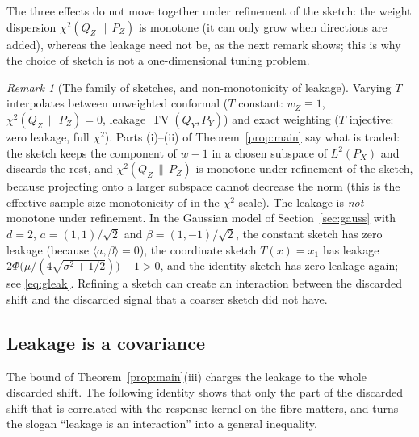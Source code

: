 \documentclass[11pt,a4paper]{article}
\newcommand{\PX}{P_X}
\newcommand{\chisqZ}{\chi^2(Q_Z\,\|\,P_Z)}
\newcommand{\TV}{\operatorname{TV}}
\theoremstyle{plain}
\theoremstyle{definition}
\theoremstyle{remark}
\newtheorem{remark}[theorem]{Remark}
\begin{document}
The three effects do not move together under refinement of the sketch: the weight dispersion $\chisqZ$ is monotone (it can only grow when directions are added), whereas the leakage need not be, as the next remark shows; this is why the choice of sketch is not a one-dimensional tuning problem.
\begin{remark}[The family of sketches, and non-monotonicity of leakage]\label{rem:family}
Varying $T$ interpolates between unweighted conformal ($T$ constant: $w_Z\equiv1$, $\chisqZ=0$, leakage $\TV(Q_Y,P_Y)$) and exact weighting ($T$ injective: zero leakage, full $\chi^2$). Parts (i)--(ii) of Theorem~\ref{prop:main} say what is traded: the sketch keeps the component of $w-1$ in a chosen subspace of $L^2(\PX)$ and discards the rest, and $\chisqZ$ is monotone under refinement of the sketch, because projecting onto a larger subspace cannot decrease the norm (this is the effective-sample-size monotonicity of \cite[Thm.\ 5.2]{polo2022} in the $\chi^2$ scale). The leakage is \emph{not} monotone under refinement. In the Gaussian model of Section~\ref{sec:gauss} with $d=2$, $a=(1,1)/\sqrt2$ and $\beta=(1,-1)/\sqrt2$, the constant sketch has zero leakage (because $\langle a,\beta\rangle=0$), the coordinate sketch $T(x)=x_1$ has leakage $2\Phi\bigl(\mu/(4\sqrt{\sigma^2+1/2})\bigr)-1>0$, and the identity sketch has zero leakage again; see \eqref{eq:gleak}. Refining a sketch can create an interaction between the discarded shift and the discarded signal that a coarser sketch did not have.
\end{remark}

\subsection{Leakage is a covariance}\label{sec:cov}

The bound of Theorem~\ref{prop:main}(iii) charges the leakage to the whole discarded shift. The following identity shows that only the part of the discarded shift that is correlated with the response kernel on the fibre matters, and turns the slogan ``leakage is an interaction'' into a general inequality.
\end{document}
